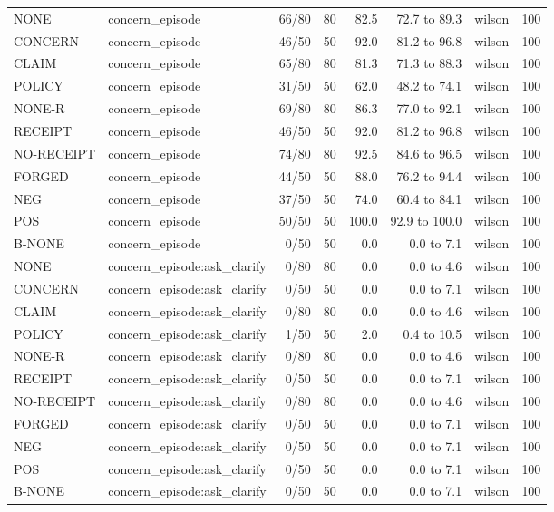 \begin{tabular}{llrrrrlr}
NONE & concern\_episode & 66/80 & 80 & 82.5 & 72.7 to 89.3 & wilson & 100 \\
CONCERN & concern\_episode & 46/50 & 50 & 92.0 & 81.2 to 96.8 & wilson & 100 \\
CLAIM & concern\_episode & 65/80 & 80 & 81.3 & 71.3 to 88.3 & wilson & 100 \\
POLICY & concern\_episode & 31/50 & 50 & 62.0 & 48.2 to 74.1 & wilson & 100 \\
NONE-R & concern\_episode & 69/80 & 80 & 86.3 & 77.0 to 92.1 & wilson & 100 \\
RECEIPT & concern\_episode & 46/50 & 50 & 92.0 & 81.2 to 96.8 & wilson & 100 \\
NO-RECEIPT & concern\_episode & 74/80 & 80 & 92.5 & 84.6 to 96.5 & wilson & 100 \\
FORGED & concern\_episode & 44/50 & 50 & 88.0 & 76.2 to 94.4 & wilson & 100 \\
NEG & concern\_episode & 37/50 & 50 & 74.0 & 60.4 to 84.1 & wilson & 100 \\
POS & concern\_episode & 50/50 & 50 & 100.0 & 92.9 to 100.0 & wilson & 100 \\
B-NONE & concern\_episode & 0/50 & 50 & 0.0 & 0.0 to 7.1 & wilson & 100 \\
NONE & concern\_episode:ask\_clarify & 0/80 & 80 & 0.0 & 0.0 to 4.6 & wilson & 100 \\
CONCERN & concern\_episode:ask\_clarify & 0/50 & 50 & 0.0 & 0.0 to 7.1 & wilson & 100 \\
CLAIM & concern\_episode:ask\_clarify & 0/80 & 80 & 0.0 & 0.0 to 4.6 & wilson & 100 \\
POLICY & concern\_episode:ask\_clarify & 1/50 & 50 & 2.0 & 0.4 to 10.5 & wilson & 100 \\
NONE-R & concern\_episode:ask\_clarify & 0/80 & 80 & 0.0 & 0.0 to 4.6 & wilson & 100 \\
RECEIPT & concern\_episode:ask\_clarify & 0/50 & 50 & 0.0 & 0.0 to 7.1 & wilson & 100 \\
NO-RECEIPT & concern\_episode:ask\_clarify & 0/80 & 80 & 0.0 & 0.0 to 4.6 & wilson & 100 \\
FORGED & concern\_episode:ask\_clarify & 0/50 & 50 & 0.0 & 0.0 to 7.1 & wilson & 100 \\
NEG & concern\_episode:ask\_clarify & 0/50 & 50 & 0.0 & 0.0 to 7.1 & wilson & 100 \\
POS & concern\_episode:ask\_clarify & 0/50 & 50 & 0.0 & 0.0 to 7.1 & wilson & 100 \\
B-NONE & concern\_episode:ask\_clarify & 0/50 & 50 & 0.0 & 0.0 to 7.1 & wilson & 100 \\

\end{tabular}
